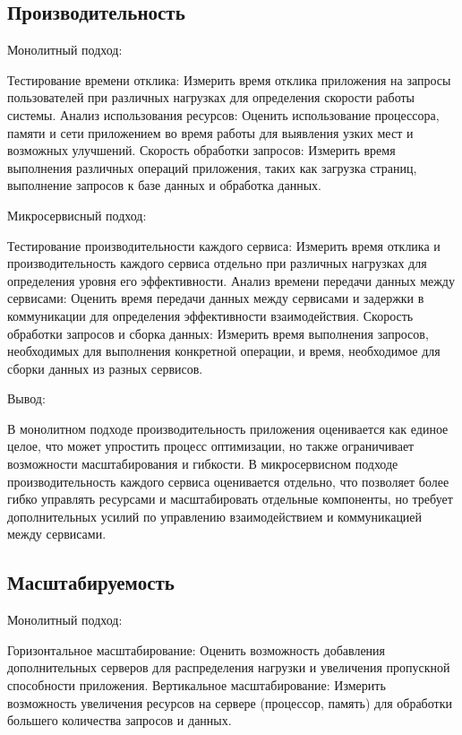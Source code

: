\subsection{Производительность}

Монолитный подход:

    Тестирование времени отклика: Измерить время отклика приложения на запросы пользователей при различных нагрузках для определения скорости работы системы.
    Анализ использования ресурсов: Оценить использование процессора, памяти и сети приложением во время работы для выявления узких мест и возможных улучшений.
    Скорость обработки запросов: Измерить время выполнения различных операций приложения, таких как загрузка страниц, выполнение запросов к базе данных и обработка данных.

Микросервисный подход:

    Тестирование производительности каждого сервиса: Измерить время отклика и производительность каждого сервиса отдельно при различных нагрузках для определения уровня его эффективности.
    Анализ времени передачи данных между сервисами: Оценить время передачи данных между сервисами и задержки в коммуникации для определения эффективности взаимодействия.
    Скорость обработки запросов и сборка данных: Измерить время выполнения запросов, необходимых для выполнения конкретной операции, и время, необходимое для сборки данных из разных сервисов.

Вывод:

    В монолитном подходе производительность приложения оценивается как единое целое, что может упростить процесс оптимизации, но также ограничивает возможности масштабирования и гибкости.
    В микросервисном подходе производительность каждого сервиса оценивается отдельно, что позволяет более гибко управлять ресурсами и масштабировать отдельные компоненты, но требует дополнительных усилий по управлению взаимодействием и коммуникацией между сервисами.

\subsection{Масштабируемость}

Монолитный подход:

    Горизонтальное масштабирование: Оценить возможность добавления дополнительных серверов для распределения нагрузки и увеличения пропускной способности приложения.
    Вертикальное масштабирование: Измерить возможность увеличения ресурсов на сервере (процессор, память) для обработки большего количества запросов и данных.

